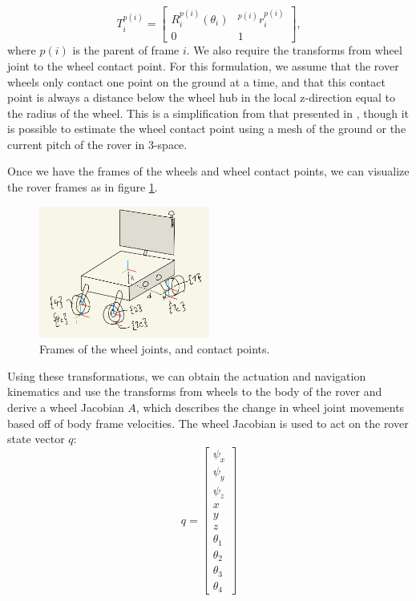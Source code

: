 \documentclass[12pt]{article}
\begin{document}
\begin{equation}
    T_i^{p(i)} = \begin{bmatrix}
    R_i^{p(i)}(\theta_i) & ^{p(i)}r^{p(i)}_i \\
    0   & 1
    \end{bmatrix},
\end{equation}
where $p(i)$ is the parent of frame $i$. 
We also require the transforms from wheel joint to the wheel contact point. 
For this formulation, we assume that the rover wheels only contact one point on the ground at a time, and that this contact point is always a distance below the wheel hub in the local z-direction equal to the radius of the wheel. 
This is a simplification from that presented in \cite{Seegmiller-2014-7945}, though it is possible to estimate the wheel contact point using a mesh of the ground or the current pitch of the rover in 3-space. 

Once we have the frames of the wheels and wheel contact points, we can visualize the rover frames as in figure \ref{fig:frames}. 
\begin{figure}
    \centering
    \includegraphics[width=0.5\textwidth]{images/frames.png}
    \caption{Frames of the wheel joints, and contact points.}
    \label{fig:frames}
\end{figure}
Using these transformations, we can obtain the actuation and navigation kinematics and use the transforms from wheels to the body of the rover and derive a wheel Jacobian $A$, which describes the change in wheel joint movements based off of body frame velocities. 
The wheel Jacobian is used to act on the rover state vector $q$:
\begin{equation}
q = \begin{bmatrix}   
\psi_x \\
\psi_y \\
\psi_z \\
x \\
y \\
z \\
\theta_1 \\
\theta_2 \\
\theta_3 \\
\theta_4
\end{bmatrix}
\end{equation}
\end{document}

